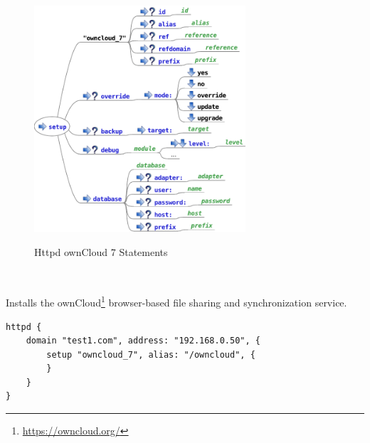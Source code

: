 \begin{figure}[htp]
\centering
\includegraphics[width=0.7\textwidth]{httpd_setup_owncloud_7_script}
\label{fig:httpd_setup_owncloud_7_script}
\caption{Httpd ownCloud 7 Statements}
\end{figure}


\\

Installs the ownCloud\footnote{\url{https://owncloud.org/}} browser-based
file sharing and synchronization service.

\begin{lstlisting}[style=Java]
httpd {
    domain "test1.com", address: "192.168.0.50", {
        setup "owncloud_7", alias: "/owncloud", {
        }
    }
}
\end{lstlisting}


